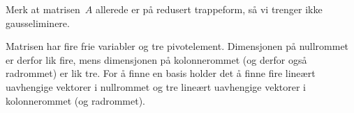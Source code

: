 \begin{oppgave}


\end{oppgave}

\begin{losning}

\begin{punkt}
Merk at matrisen~$A$ allerede er på redusert trappeform,
så vi trenger ikke gausseliminere.

Matrisen har fire frie variabler og tre pivotelement. Dimensjonen på nullrommet er derfor lik fire, mens dimensjonen på kolonnerommet (og derfor også radrommet) er lik tre. For å finne en basis holder det å finne fire lineært uavhengige vektorer i nullrommet og tre lineært uavhengige vektorer i kolonnerommet (og radrommet).



\end{punkt}
\end{losning}
